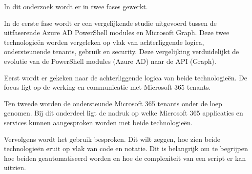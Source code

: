 \begin{comment}
In de derde fase volgt een nabootsing van een realistische Linux-omgeving. Aan de hand van geautomatiseerde configuraties ontstaat de mogelijkheid om een omgeving op te zetten. Hierbij wordt Ansible als Configuration Management tool ingezet voor het opzetten van de infrastructuur. In de testomgeving voorzien we vier virtuele servers en een virtuele client. Waarbij alle virtuele machines AlmaLinux \autocite{AOF2022} als distributie gebruiken. De eerste server maakt gebruik van BIND \autocite{ISC2022} om de DNS (Domain Name System) te voorzien. De tweede server voorziet DHCP (Dynamic Host Configuration Protocol) met dynamische IP-adressen voor de virtuele client. De derde server fungeert als webserver en databank met een \textcite{WordPress2022} installatie. De laatste server maakt gebruik van Prometheus \autocite{PrometheusAuthors2022} en Grafana \autocite{GrafanaLabs2022} om de servers te kunnen monitoren. De client is een gebruiker van het domein en test de beschikbare functionaliteiten.

De laatste fase omvat een Disaster Recovery-scenario waarbij de omgeving wordt beschadigd. Door deze beschadiging wordt de omgeving nogmaals opgezet aan de hand van automatisatie uit de tweede fase. Er wordt gekeken naar welke impact de automatisatie heeft in vergelijking met de manuele manier van configureren. Deze impact wordt geanalyseerd en getest, nadien worden alle bevinden verwerkt in de scriptie.

\end{comment}

In dit onderzoek wordt er in twee fases gewerkt.
 
In de eerste fase wordt er een vergelijkende studie uitgevoerd tussen de uitfaserende Azure AD PowerShell modules en Microsoft Graph. Deze twee technologieën worden vergeleken op vlak van achterliggende logica, ondersteunende tenants, gebruik en security. Deze vergelijking verduidelijkt de evolutie van de PowerShell modules (Azure AD) naar de API (Graph).

Eerst wordt er gekeken naar de achterliggende logica van beide technologieën. De focus ligt op de werking en communicatie met Microsoft 365 tenants. 

Ten tweede worden de ondersteunde Microsoft 365 tenants onder de loep genomen. Bij dit onderdeel ligt de nadruk op welke Microsoft 365 applicaties en services kunnen aangesproken worden met beide technologieën.

Vervolgens wordt het gebruik besproken. Dit wilt zeggen, hoe zien beide technologieën eruit op vlak van code en notatie. Dit is belangrijk om te begrijpen hoe beiden geautomatiseerd worden en hoe de complexiteit van een script er kan uitzien.

